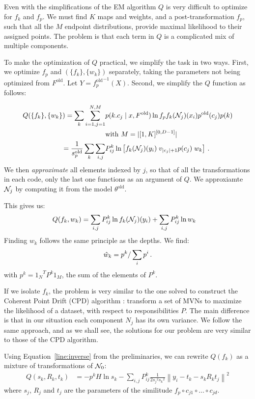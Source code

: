 Even with the simplifications of the EM algorithm $Q$ is very difficult to optimize for $f_k$ and $f_p$. We must find $K$ maps and weights, and a post-transformation $f_p$, such that all the $M$ endpoint distributions, provide maximal likelihood to their assigned points. The problem is that each term in $Q$ is a complicated mix of multiple components.

To make the optimization of $Q$ practical, we simplify the task in two ways. First, we optimize $f_p$ and $(\{f_k\}, \{w_k\})$ separately, taking the parameters not being optimized from $F^\text{old}$. Let $Y = {f_p^\text{old}}^{-1}(X)$. Second, we simplify the $Q$ function as follows: 

\begin{align*}
Q(\{f_k\}, \{w_k\}) = \sum_k \sum_{i=1,j=1}^{N, M} & p(k.c_j \mid x, F^\text{old}) \ln f_p f_k(\cN_{j})(x_i) p^{\text{old}}(c_j) p(k)\\ & \hfill \text{with } M = |[1,K]^{[0, D-1]}|  \\
= \frac{1}{s^\text{old}_p}\sum_k \sum_{i, j} &P^k_{ij} \ln \left[ f_k(\cN_{j})(y_i) \; v_{|c_j|+1} p(c_j) \; w_k \right]\p
\end{align*}
We then \emph{approximate} all elements indexed by $j$, so that of all the transformations in each code, only the last one functions as an argument of $Q$. We approxiamte ${\cal N}_j$ by computing it from the model $\theta^\text{old}$.

This gives us:
\begin{align*}
Q(f_k, w_k) &= \sum_{i, j} P^k_{ij} \ln f_k({\cal N}_j)(y_i) + \sum_{i, j} P^k_{ij} \ln w_k  
\end{align*}
Finding $w_k$ follows the same principle as the depths. We find:
\[
\hat w_k = p^k / \sum_{i} p^i \,\text{.}
\]
with $p^k = {1_N}^TP^k1_M$, the sum of the elements of $P^k$.

If we isolate $f_k$, the problem is very similar to the one solved to construct the Coherent Point Drift (CPD) algorithm \cite{myronenko2010point}: transform a set of MVNs to maximize the likelihood of a dataset, with respect to responsibilities $P$. The main difference is that in our situation each component $N_j$ has its own variance. We follow the same approach, and as we shall see, the solutions for our problem are very similar to those of the CPD algorithm.

Using Equation~\ref{line:inverse} from the preliminaries, we can rewrite $Q(f_k)$ as a mixture of transformations of ${\cal N}_0$:
\begin{align*} 
Q(s_k, R_k, t_k) &= - p^k H \ln s_k - \sum_{i, j} P^k_{ij} \frac{1}{2{s_j}^2{s_k}^2} \left\|y_i-t_k - s_k R_k t_j \right\|^2 
\end{align*}
where $s_j$, $R_j$ and $t_j$ are the parameters of the similitude $f_p \circ c_{j1} \circ \ldots \circ c_{jd}$. 

